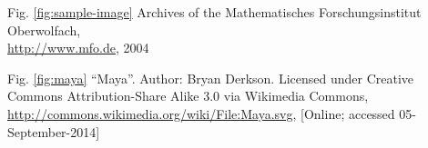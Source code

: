 \documentclass{snapshotmfo}
\begin{document}
\begin{imagecredits}
  \item[Fig. \ref{fig:sample-image}] Archives of the Mathematisches Forschungsinstitut Oberwolfach,\\\url{http://www.mfo.de}, 2004
  \item[Fig. \ref{fig:maya}] ``Maya''. Author: Bryan Derkson. Licensed under Creative Commons Attribution-Share Alike 3.0 via Wikimedia Commons, \url{http://commons.wikimedia.org/wiki/File:Maya.svg}, [Online; accessed 05-September-2014]
\end{imagecredits}



%
\end{document}
